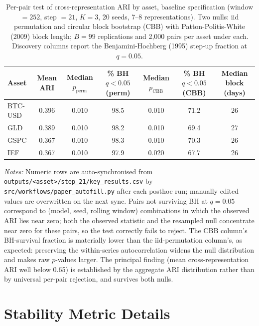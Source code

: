 \documentclass[preprint,12pt,authoryear]{elsarticle}
\begin{document}
\begin{table}[!htbp]
\centering
\small
\setlength{\tabcolsep}{4pt}
\caption{Per-pair test of cross-representation ARI by asset, baseline specification (window $=252$, step $=21$, $K=3$, 20 seeds, 7--8 representations). Two nulls: iid permutation and \citet{PolitisRomano1992CBB} circular block bootstrap (CBB) with Patton-Politis-White (2009) block length; $B=99$ replications and 2{,}000 pairs per asset under each. Discovery columns report the Benjamini-Hochberg (1995) step-up fraction at $q=0.05$.}
\label{tab:perm_per_asset}
\begin{tabular}{lcccccc}
\toprule
Asset & Mean ARI & Median $p_\text{perm}$ & \% BH $q<0.05$ (perm) & Median $p_\text{CBB}$ & \% BH $q<0.05$ (CBB) & Median block (days) \\
\midrule
BTC-USD & 0.396 & 0.010 & 98.5 & 0.010 & 71.2 & 26 \\
GLD & 0.389 & 0.010 & 98.2 & 0.010 & 69.4 & 27 \\
GSPC & 0.367 & 0.010 & 98.3 & 0.010 & 70.3 & 26 \\
IEF & 0.367 & 0.010 & 97.9 & 0.020 & 67.7 & 26 \\
\bottomrule
\end{tabular}
\medskip
\footnotesize
\textit{Notes:} Numeric rows are auto-synchronised from \texttt{outputs/<asset>/step\_21/key\_results.csv} by \texttt{src/workflows/paper\_autofill.py} after each posthoc run; manually edited values are overwritten on the next sync. Pairs not surviving BH at $q=0.05$ correspond to (model, seed, rolling window) combinations in which the observed ARI lies near zero; both the observed statistic and the resampled null concentrate near zero for these pairs, so the test correctly fails to reject. The CBB column's BH-survival fraction is materially lower than the iid-permutation column's, as expected: preserving the within-series autocorrelation widens the null distribution and makes raw $p$-values larger. The principal finding (mean cross-representation ARI well below 0.65) is established by the aggregate ARI distribution rather than by universal per-pair rejection, and survives both nulls.
\end{table}

\section{Stability Metric Details}
\label{app:metrics}
\end{document}
